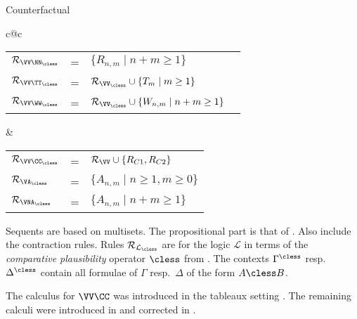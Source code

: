 \begin{entry}{Counterfactual}
\begin{calculus}
\begin{center}
\begin{tabular}{c@{\qquad}c}
  \\
\begin{tabular}{lll}
$\Rules_{\VV\NN_\cless}$ & = & $\{ R_{n,m} \mid n+m \geq 1\}$\\
$\Rules_{\VV\TT_\cless}$ & = & $\Rules_{\VV_\cless}\cup \{T_m \mid m \geq 1\}$\\
$\Rules_{\VV\WW_\cless}$ & = &$\Rules_{\VV_\cless}\cup \{W_{n,m}\mid n
+ m \geq 1\}\quad$
\end{tabular} &
\begin{tabular}{lll}
$\Rules_{\VV\CC_\cless}$ & = & $\Rules_\VV\cup\{R_{C1},R_{C2}\}$\\
$\Rules_{\VA_\cless}$ & = & $\{ A_{n,m} \mid n\geq 1, m\geq 0 \}$\\
$\Rules_{\VNA_\cless}$ & = & $\{ A_{n,m} \mid n + m\geq 1 \}$
\end{tabular}
\end{tabular}
\end{center}


\end{calculus}

\begin{clarifications}
  Sequents are based on multisets.  The propositional part is that of
  \Gtc {}. Also include the contraction rules.  Rules
  $\Rules_{\mathcal{L}_\cless}$ are for the logic $\mathcal{L}$ in
  terms of the \emph{comparative plausibility} operator $\cless$ from
  \cite{Lewis:1973uq}.  The contexts $\Gamma^\cless$ resp.\
  $\Delta^\cless$ contain all formulae of $\Gamma$ resp.\ $\Delta$ of
  the form $A \cless B$.
\end{clarifications}

\begin{history}
  The calculus for $\VV\CC$ was introduced in the tableaux setting
  \cite{Swart:1983uq,Gent:1992p3090}.  The remaining calculi were
  introduced in \cite{Lellmann:2012fk,Lellmann:2013fk} and corrected
  in \cite{Lellmann:2013}.
\end{history}


\end{entry}
